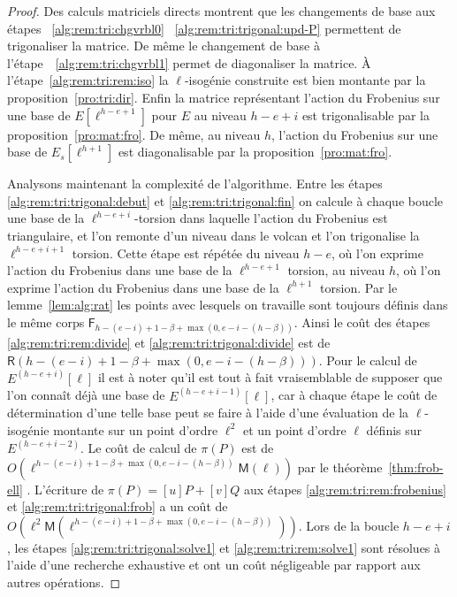 \documentclass[10pt,a4paper]{book}
\theoremstyle{plain}
\theoremstyle{definition}
\theoremstyle{definition}
\theoremstyle{definition}
\theoremstyle{definition}
\theoremstyle{remark}
\theoremstyle{remark}
\theoremstyle{definition}
\begin{document}
\begin{proof}
Des calculs matriciels directs montrent que les changements de base aux étapes
 ~\ref{alg:rem:tri:chgvrbl0} ~\ref{alg:rem:tri:trigonal:upd-P} permettent de 
trigonaliser la matrice. De même le changement de base à 
l'étape~~\ref{alg:rem:tri:chgvrbl1} permet de diagonaliser la matrice.
\`A l'étape~\ref{alg:rem:tri:rem:iso} la $\ell$-isogénie construite est bien 
montante par la proposition~\ref{pro:tri:dir}. Enfin la matrice représentant
l'action du Frobenius sur une base de $E[\ell^{h-e+1}]$ pour $E$ au niveau 
$h-e+i$ est trigonalisable par la proposition~\ref{pro:mat:fro}. De même, au 
niveau $h$, l'action du Frobenius sur une base de $E_s[\ell^{h+1}]$ est 
diagonalisable par la proposition~\ref{pro:mat:fro}.
 
Analysons maintenant la complexité de l'algorithme. 
Entre les étapes \ref{alg:rem:tri:trigonal:debut} et \ref{alg:rem:tri:trigonal:fin}
on calcule à chaque boucle une base de la $\ell^{h-e+i}$-torsion dans laquelle
l'action du Frobenius est triangulaire, et l'on remonte d'un niveau dans le 
volcan et l'on trigonalise la $\ell^{h-e+i+1}$ torsion. Cette étape est répétée
du niveau $h-e$, où l'on exprime
l'action du Frobenius dans une base de la $\ell^{h-e+1}$ torsion, au niveau $h$, 
où l'on exprime l'action du Frobenius dans une base de la $\ell^{h+1}$ torsion.
Par le lemme~\ref{lem:alg:rat} les points avec lesquels on travaille sont 
toujours définis dans le même corps $\mathsf{F}_{h-(e-i)+1-\beta+\max(0,e-i-
(h-\beta))}$. Ainsi le coût des étapes \ref{alg:rem:tri:rem:divide} et 
\ref{alg:rem:tri:trigonal:divide} est de $\mathsf{R}(h-(e-i)+1-\beta+\max(0,e-i
-(h-\beta)))$. Pour le calcul de $E^{(h-e+i)}[\ell]$ il est à noter qu'il est 
tout à fait vraisemblable de supposer que l'on connaît déjà une base de 
$E^{(h-e+i-1)}[\ell]$, car à chaque étape le coût de détermination d'une telle 
base peut se faire à l'aide d'une évaluation de la $\ell$-isogénie montante sur
un point d'ordre $\ell^2$ et un point d'ordre $\ell$ définis sur 
 $E^{(h-e+i-2)}$. Le coût de calcul de $\pi(P)$ est de $O(\ell^{h-(e-i)+1
-\beta +\max(0,e-i-(h-\beta))}\mathsf{M}(\ell))$ par le 
théorème~\ref{thm:frob-ell} . L'écriture de $\pi(P)=[u]P+[v]Q$ 
aux étapes \ref{alg:rem:tri:rem:frobenius} et \ref{alg:rem:tri:trigonal:frob} a
un coût de $O(\ell^2 \mathsf{M}(\ell^{h-(e-i)+1-\beta+\max(0,e-i-(h-\beta))}))$. 
Lors de la boucle $h-e+i$, les étapes \ref{alg:rem:tri:trigonal:solve1} et 
\ref{alg:rem:tri:rem:solve1} sont résolues à l'aide d'une recherche exhaustive 
et ont un coût négligeable par rapport aux autres opérations. 



\end{proof}
\end{document}

